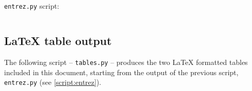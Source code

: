 \documentclass[10pt,a4paper]{article}
\begin{document}
\texttt{entrez.py} script:
\label{script:entrez}
\inputminted{python}{src/entrez.py}

\subsection{\LaTeX{} table output}
The following script -- \texttt{tables.py} -- produces the two \LaTeX{} formatted tables included in this document, starting from the output of the previous script, \texttt{entrez.py} (see \ref{script:entrez}).
\label{script:table}
\inputminted{python}{src/tables.py}



\end{document}

